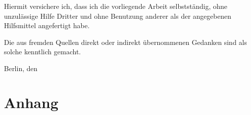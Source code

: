 \documentclass[a4paper, 11pt]{article}
\begin{document}
Hiermit versichere ich, dass ich die vorliegende Arbeit selbstständig, ohne unzulässige Hilfe Dritter und ohne Benutzung anderer als der angegebenen Hilfsmittel angefertigt habe.

Die aus fremden Quellen direkt oder indirekt übernommenen Gedanken sind als solche kenntlich gemacht. 

Berlin, den \thedate

\newpage
\section*{Anhang}
\end{document}

